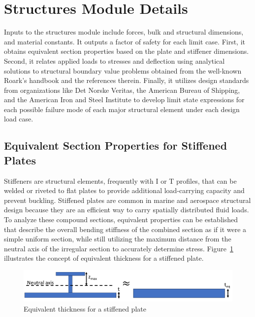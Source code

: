\section{Structures Module Details}
\label{sec:appendix-structures}
Inputs to the structures module include forces, bulk and structural dimensions, and material constants.
It outputs a factor of safety for each limit case.
First, it obtains equivalent section properties based on the plate and stiffener dimensions.
Second, it relates applied loads to stresses and deflection using analytical solutions to structural boundary value problems obtained from the well-known Roark's handbook \cite{young_roarks_2001} and the references therein.
Finally, it utilizes design standards from organizations like Det Norske Veritas, the American Bureau of Shipping, and the American Iron and Steel Institute to develop limit state expressions for each possible failure mode of each major structural element under each design load case. %

\subsection{Equivalent Section Properties for Stiffened Plates}\label{sec:equivalent-thickness}
Stiffeners are structural elements, frequently with I or T profiles, that can be welded or riveted to flat plates to provide additional load-carrying capacity and prevent buckling.
Stiffened plates are common in marine and aerospace structural design because they are an efficient way to carry spatially distributed fluid loads.
To analyze these compound sections, equivalent properties can be established that describe the overall bending stiffness of the combined section as if it were a simple uniform section, while still utilizing the maximum distance from the neutral axis of the irregular section to accurately determine stress.
Figure~\ref{fig:stiffened-plate} illustrates the concept of equivalent thickness for a stiffened plate.
\begin{figure}
    \centering
    \includegraphics[width=\linewidth]{figs/stiffener_equivalence.pdf}
    \caption{Equivalent thickness for a stiffened plate}
    \label{fig:stiffened-plate}
\end{figure}


